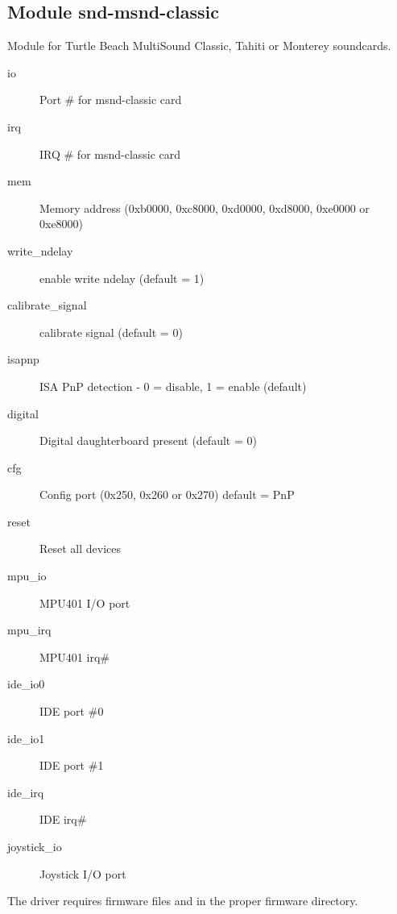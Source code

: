 \documentclass[a4paper,8pt,english]{sphinxmanual}
\begin{document}
\subsection{Module snd-msnd-classic}
\label{sound/alsa-configuration:module-snd-msnd-classic}
Module for Turtle Beach MultiSound Classic, Tahiti or Monterey
soundcards.
\begin{description}
\item[{io}] \leavevmode
Port \# for msnd-classic card

\item[{irq}] \leavevmode
IRQ \# for msnd-classic card

\item[{mem}] \leavevmode
Memory address (0xb0000, 0xc8000, 0xd0000, 0xd8000, 0xe0000 or 0xe8000)

\item[{write\_ndelay}] \leavevmode
enable write ndelay (default = 1)

\item[{calibrate\_signal}] \leavevmode
calibrate signal (default = 0)

\item[{isapnp}] \leavevmode
ISA PnP detection - 0 = disable, 1 = enable (default)

\item[{digital}] \leavevmode
Digital daughterboard present (default = 0)

\item[{cfg}] \leavevmode
Config port (0x250, 0x260 or 0x270) default = PnP

\item[{reset}] \leavevmode
Reset all devices

\item[{mpu\_io}] \leavevmode
MPU401 I/O port

\item[{mpu\_irq}] \leavevmode
MPU401 irq\#

\item[{ide\_io0}] \leavevmode
IDE port \#0

\item[{ide\_io1}] \leavevmode
IDE port \#1

\item[{ide\_irq}] \leavevmode
IDE irq\#

\item[{joystick\_io}] \leavevmode
Joystick I/O port

\end{description}

The driver requires firmware files  and
 in the proper firmware directory.
\end{document}
